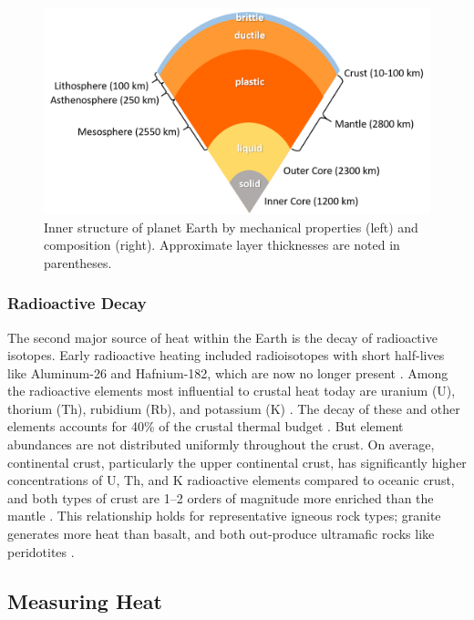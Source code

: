 \begin{figure}[!htp]
\centering
\includegraphics[width=.9\textwidth]{templates/images/Figure-Earth_structure.png}
\caption[Earth mechanical and compositional structure]{Inner structure of planet Earth by mechanical properties (left) and composition (right). Approximate layer thicknesses are noted in parentheses.}
\label{fig:earth_structure}
\end{figure}

\subsubsection{Radioactive Decay}\label{ch2:radio}
The second major source of heat within the Earth is the decay of radioactive isotopes. Early radioactive heating included radioisotopes with short half-lives like Aluminum-26 and Hafnium-182, which are now no longer present \citep[p.\ 16]{glassley_geothermal_2015}. Among the radioactive elements most influential to crustal heat  today are uranium (U), thorium (Th), rubidium (Rb), and potassium (K) \citep[p.\ 17]{glassley_geothermal_2015}. The decay of these and other elements accounts for 40\% of the crustal thermal budget \citep{stein_heat_1995}. But element abundances are not distributed uniformly throughout the crust. On average, continental crust, particularly the upper continental crust, has significantly higher concentrations of U, Th, and K radioactive elements compared to oceanic crust, and both types of crust are 1--2 orders of magnitude more enriched than the mantle \citep[p.\ 276]{fowler_solid_2005}. This relationship holds for representative igneous rock types; granite generates more heat than basalt, and both out-produce ultramafic rocks like peridotites \citep[p.\ 276]{fowler_solid_2005}.

\subsection{Measuring Heat}\label{ch2:heat_measure}

